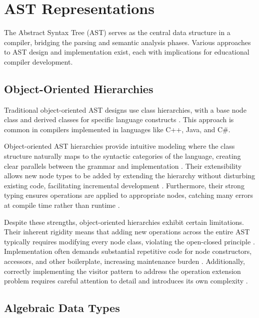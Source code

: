 \pagebreak







\section{AST Representations}

The Abstract Syntax Tree (AST) serves as the central data structure in a compiler, bridging the parsing and semantic analysis phases. Various approaches to AST design and implementation exist, each with implications for educational compiler development.

\subsection{Object-Oriented Hierarchies}

Traditional object-oriented AST designs use class hierarchies, with a base node class and derived classes for specific language constructs \cite{gamma1995design}. This approach is common in compilers implemented in languages like C++, Java, and C\#.

Object-oriented AST hierarchies provide intuitive modeling where the class structure naturally maps to the syntactic categories of the language, creating clear parallels between the grammar and implementation \cite{appel2004modern}. Their extensibility allows new node types to be added by extending the hierarchy without disturbing existing code, facilitating incremental development \cite{gamma1995design}. Furthermore, their strong typing ensures operations are applied to appropriate nodes, catching many errors at compile time rather than runtime \cite{odersky2004overview}.

Despite these strengths, object-oriented hierarchies exhibit certain limitations. Their inherent rigidity means that adding new operations across the entire AST typically requires modifying every node class, violating the open-closed principle \cite{gamma1995design}. Implementation often demands substantial repetitive code for node constructors, accessors, and other boilerplate, increasing maintenance burden \cite{appel2004modern}. Additionally, correctly implementing the visitor pattern to address the operation extension problem requires careful attention to detail and introduces its own complexity \cite{gamma1995design}.


\subsection{Algebraic Data Types}

